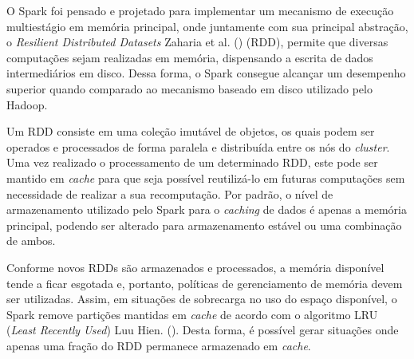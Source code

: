 O Spark foi pensado e projetado para implementar um mecanismo de execução
multiestágio em memória principal, onde juntamente com sua principal abstração,
o \textit{Resilient Distributed Datasets} Zaharia et al. 
(\citeyear{zaharia2012rdd}) (RDD), permite que diversas computações sejam 
realizadas em memória, dispensando a escrita de dados intermediários em disco. 
Dessa forma, o Spark consegue alcançar um desempenho superior quando comparado 
ao mecanismo baseado em disco utilizado pelo Hadoop. 

Um RDD consiste em uma coleção imutável de objetos, os quais podem ser operados
e processados de forma paralela e distribuída entre os nós do \textit{cluster}.
Uma vez realizado o processamento de um determinado RDD, este pode ser mantido
em \textit{cache} para que seja possível reutilizá-lo em futuras computações sem
necessidade de realizar a sua recomputação. Por padrão, o nível de armazenamento
utilizado pelo Spark para o \textit{caching} de dados é apenas a memória
principal, podendo ser alterado para armazenamento estável ou uma combinação de
ambos. 

Conforme novos RDDs são armazenados e processados, a memória disponível tende a
ficar esgotada e, portanto, políticas de gerenciamento de memória devem ser
utilizadas. Assim, em situações de sobrecarga no uso do espaço disponível, o
Spark remove partições mantidas em \textit{cache} de acordo com o algoritmo LRU
(\textit{Least Recently Used}) Luu Hien. (\citeyear{luu2018beginning}). 
Desta forma, é possível gerar situações onde apenas uma fração do RDD permanece 
armazenado em \textit{cache}.


